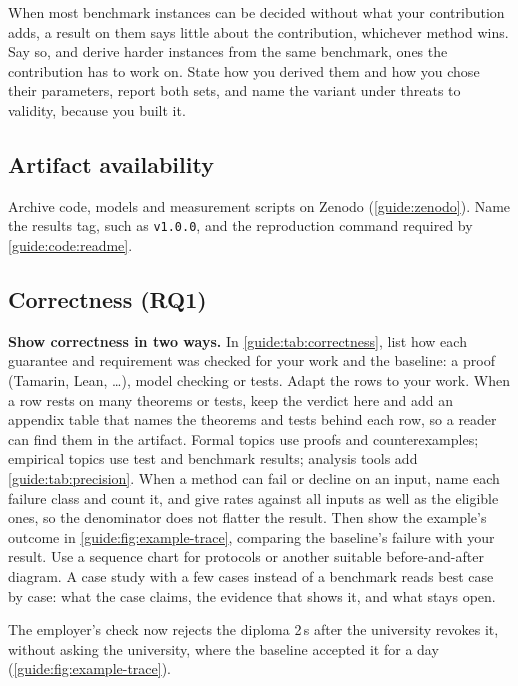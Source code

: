 When most benchmark instances can be decided without what your contribution adds, a result on them says little about the contribution, whichever method wins. Say so, and derive harder instances from the same benchmark, ones the contribution has to work on. State how you derived them and how you chose their parameters, report both sets, and name the variant under threats to validity, because you built it.

\subsection{Artifact availability}\label{guide:chapters:artifact-availability}
Archive code, models and measurement scripts on Zenodo (\cref{guide:zenodo}). Name the results tag, such as \texttt{v1.0.0}, and the reproduction command required by \cref{guide:code:readme}.

\subsection[Correctness (RQ1)]{Correctness (RQ1)\skimmark}\label{guide:chapters:correctness}
\textbf{Show correctness in two ways.} In \cref{guide:tab:correctness}, list how each guarantee and requirement was checked for your work and the baseline: a proof (Tamarin, Lean, \dots), model checking or tests. Adapt the rows to your work. When a row rests on many theorems or tests, keep the verdict here and add an appendix table that names the theorems and tests behind each row, so a reader can find them in the artifact. Formal topics use proofs and counterexamples; empirical topics use test and benchmark results; analysis tools add \cref{guide:tab:precision}. When a method can fail or decline on an input, name each failure class and count it, and give rates against all inputs as well as the eligible ones, so the denominator does not flatter the result. Then show the example's outcome in \cref{guide:fig:example-trace}, comparing the baseline's failure with your result. Use a sequence chart for protocols or another suitable before-and-after diagram. A case study with a few cases instead of a benchmark reads best case by case: what the case claims, the evidence that shows it, and what stays open.
\begin{runningexample}[solved]
The employer's check now rejects the diploma 2\,s after the university revokes it, without asking the university, where the baseline accepted it for a day (\cref{guide:fig:example-trace}).
\end{runningexample}

